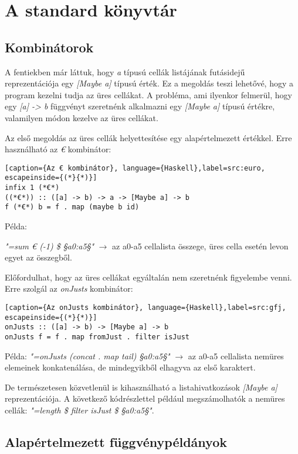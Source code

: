 \section{A standard könyvtár}

\subsection{Kombinátorok}

A fentiekben már láttuk, hogy \textit{a} típusú cellák listájának futásidejű reprezentációja egy \textit{[Maybe a]} típusú érték. Ez a megoldás teszi lehetővé, hogy a program kezelni tudja az üres cellákat. A probléma, ami ilyenkor felmerül, hogy egy \textit{[a] -> b} függvényt szeretnénk alkalmazni egy \textit{[Maybe a]} típusú értékre, valamilyen módon kezelve az üres cellákat.

Az első megoldás az üres cellák helyettesítése egy alapértelmezett értékkel. Erre használható az \textit{€} kombinátor:

\begin{lstlisting}[caption={Az € kombinátor}, language={Haskell},label=src:euro, escapeinside={(*}{*)}]
infix 1 (*€*)
((*€*)) :: ([a] -> b) -> a -> [Maybe a] -> b
f (*€*) b = f . map (maybe b id)
\end{lstlisting}

Példa:

\textit{"=sum € (-1) \$ §a0:a5§"} $\rightarrow$ az a0-a5 cellalista összege, üres cella esetén levon egyet az összegből.

Előfordulhat, hogy az üres cellákat egyáltalán nem szeretnénk figyelembe venni. Erre szolgál az \textit{onJusts} kombinátor:

\begin{lstlisting}[caption={Az onJusts kombinátor}, language={Haskell},label=src:gfj, escapeinside={(*}{*)}]
onJusts :: ([a] -> b) -> [Maybe a] -> b
onJusts f = f . map fromJust . filter isJust 
\end{lstlisting}

Példa:
\textit{"=onJusts (concat . map tail) §a0:a5§"} $\rightarrow$ az a0-a5 cellalista nemüres elemeinek konkatenálása, de mindegyikből elhagyva az első karaktert.

De természetesen közvetlenül is kihasználható a listahivatkozások \textit{[Maybe a]} reprezentációja. A következő kódrészlettel például megszámolhatók a nemüres cellák: \textit{"=length \$ filter isJust \$ §a0:a5§"}.

\subsection{Alapértelmezett függvénypéldányok}

